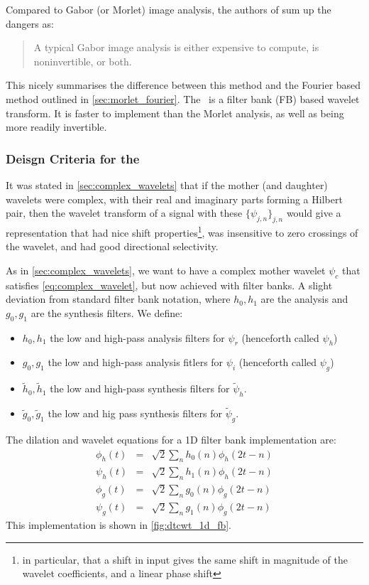   Compared to Gabor (or Morlet) image analysis, the authors of
  \cite{selesnick_dual-tree_2005} sum up the dangers as:
  \begin{quote}
    A typical Gabor image analysis is either expensive to compute, is
    noninvertible, or both.
  \end{quote}
  This nicely summarises the difference between this method and the Fourier
  based method outlined in \autoref{sec:morlet_fourier}. The \DTCWT\ is
  a filter bank (FB) based wavelet transform. It is faster
  to implement than the Morlet analysis, as well as being more readily invertible.

\subsubsection{Deisgn Criteria for the \DTCWT}
  It was stated in
  \autoref{sec:complex_wavelets} that if the mother (and daughter) wavelets
  were complex, with their real and imaginary parts forming a Hilbert pair,
  then the wavelet transform of a signal with these $\{\psi_{j,n}\}_{j,n}$
  would give a representation that had nice shift properties\footnote{in
  particular, that a shift in input gives the same shift in magnitude of the
  wavelet coefficients, and a linear phase shift}, was insensitive to zero crossings of the
  wavelet, and had good directional selectivity. 
  
  As in \autoref{sec:complex_wavelets}, we want to have a complex mother
  wavelet $\psi_c$ that satisfies \autoref{eq:complex_wavelet}, but now
  achieved with filter banks. A slight deviation from standard filter bank
  notation, where $h_0, h_1$ are the analysis and $g_0,g_1$ are the synthesis
  filters. We define:
  \begin{itemize}
    \item $h_0, h_1$ the low and high-pass analysis filters for $\psi_r$ (henceforth called
      $\psi_h$)
    \item $g_0, g_1$ the low and high-pass analysis fitlers for $\psi_i$
      (henceforth called $\psi_g$)
    \item $\tilde{h}_0, \tilde{h}_1$ the low and high-pass synthesis filters
      for $\tilde{\psi}_h$.
    \item $\tilde{g}_0, \tilde{g}_1$ the low and hig pass synthesis filters for
      $\tilde{\psi}_g$.
  \end{itemize}

  The dilation and wavelet equations for a 1D filter bank implementation are:
  \begin{eqnarray}
    \phi_h(t) & = & \sqrt{2} \sum_n h_0(n) \phi_h(2t-n) \\
    \psi_h(t) & = & \sqrt{2} \sum_n h_1(n) \phi_h(2t-n) \\
    \phi_g(t) & = & \sqrt{2} \sum_n g_0(n) \phi_g(2t-n) \\
    \psi_g(t) & = & \sqrt{2} \sum_n g_1(n) \phi_g(2t-n) 
  \end{eqnarray}
  This implementation is shown in \autoref{fig:dtcwt_1d_fb}.

